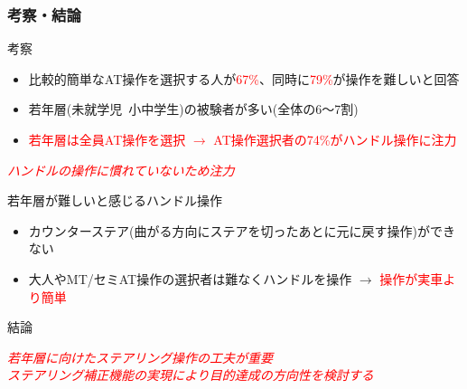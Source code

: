\documentclass[unicode, 9pt, aspectratio=169]{beamer}
\begin{document}
\begin{frame}
  \frametitle{考察・結論}
  \centering
  \begin{minipage}{.8\linewidth}
  \begin{block}{考察}
    \begin{itemize}
      \item 比較的簡単なAT操作を選択する人が\textcolor{red}{67\%}、同時に\textcolor{red}{79\%}が操作を難しいと回答
      \item 若年層(未就学児~小中学生)の被験者が多い(全体の6～7割)
      \item \textcolor{red}{若年層は全員AT操作を選択 $\to$ AT操作選択者の74\%がハンドル操作に注力}
    \end{itemize}
  \end{block}
  \vspace{-3.5truemm}
  \begin{alertblock}{}
    \centering
    \Large \emph{\textcolor{red}{ハンドルの操作に慣れていないため注力}}
  \end{alertblock}
\end{minipage}
  \begin{minipage}{.8\linewidth}
    \begin{exampleblock}{若年層が難しいと感じるハンドル操作}
      \begin{itemize}
        \item カウンターステア(曲がる方向にステアを切ったあとに元に戻す操作)ができない
        \item 大人やMT/セミAT操作の選択者は難なくハンドルを操作 $\to$ \textcolor{red}{操作が実車より簡単}
      \end{itemize}
    \end{exampleblock}
  \end{minipage}
  \begin{minipage}{.8\linewidth}
    \begin{alertblock}{結論}
      \begin{center}
        \Large \emph{\textcolor{red}{若年層に向けたステアリング操作の工夫が重要}}\\
        \Large \emph{\textcolor{red}{ステアリング補正機能の実現により目的達成の方向性を検討する}}
      \end{center}
    \end{alertblock}
  \end{minipage}
\end{frame}
\end{document}
